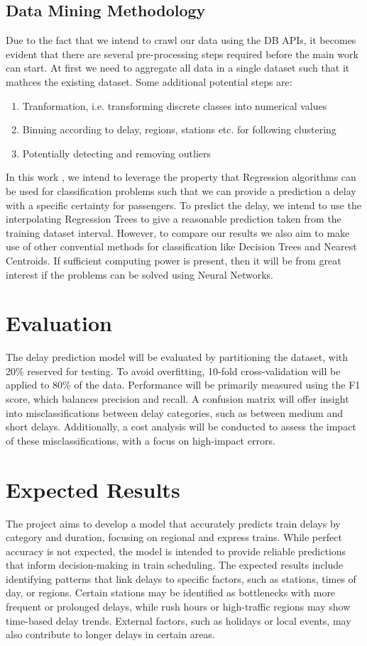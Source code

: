 \documentclass[a4paper,oneside,bibliography=totoc]{scrbook}
\begin{document}
\section{Data Mining Methodology}\label{sec:data-mining-methodology}
Due to the fact that we intend to crawl our data using the DB APIs, it becomes evident that there are several pre-processing steps required before the main work can start. At first we need to aggregate all data in a single dataset such that it mathces the existing dataset.
Some additional potential steps are:
\begin{enumerate}
    \item Tranformation, i.e. transforming discrete classes into numerical values
    \item Binning according to delay, regions, stations etc. for following clustering
    \item Potentially detecting and removing outliers
\end{enumerate}
In this work , we intend to leverage the property that Regression algorithms can be used for classification problems such that we can provide a prediction a delay with a specific certainty for passengers. To predict the delay, we intend to
use the interpolating Regression Trees to give a reasonable prediction taken from the training dataset interval. However, to compare our results we also aim to make use of other convential methods for classification like Decision Trees and Nearest Centroids.
If sufficient computing power is present, then it will be from great interest if the problems can be solved using Neural Networks.

\chapter{Evaluation}\label{ch:eval}
The delay prediction model will be evaluated by partitioning the dataset, with 20\% reserved for testing.
To avoid overfitting, 10-fold cross-validation will be applied to 80\% of the data.
Performance will be primarily measured using the F1 score, which balances precision and recall.
A confusion matrix will offer insight into misclassifications between delay categories,
such as between medium and short delays.
Additionally, a cost analysis will be conducted to assess the impact of these misclassifications,
with a focus on high-impact errors.

\chapter{Expected Results}\label{sec:expected_results}
The project aims to develop a model that accurately predicts train delays by category and duration, focusing on regional and express trains.
While perfect accuracy is not expected, the model is intended to provide reliable predictions that inform decision-making in train scheduling.
The expected results include identifying patterns that link delays to specific factors, such as stations, times of day, or regions.
Certain stations may be identified as bottlenecks with more frequent or prolonged delays, while rush hours or high-traffic regions may show time-based delay trends.
External factors, such as holidays or local events, may also contribute to longer delays in certain areas.
\end{document}
